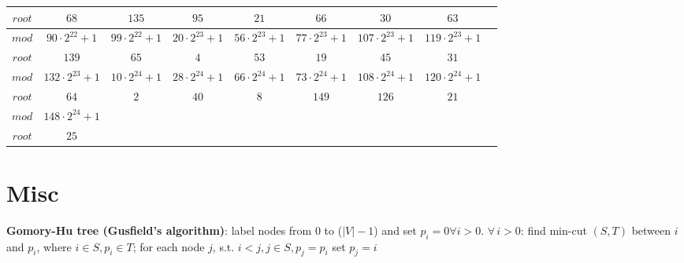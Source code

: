 \documentclass{article}
\begin{document}
\begin{tabular}{|c|c|c|c|c|c|c|c|c|}
$root$& $68$& $135$& $95$& $21$& $66$& $30$& $63$\\
\hline


$mod$& $90\cdot 2^{22}+1$& $99\cdot 2^{22}+1$& $20\cdot 2^{23}+1$& $56\cdot 2^{23}+1$& $77\cdot 2^{23}+1$& $107\cdot 2^{23}+1$& $119\cdot 2^{23}+1$\\
\hline

$root$& $139$& $65$& $4$& $53$& $19$& $45$& $31$\\
\hline


$mod$& $132\cdot 2^{23}+1$& $10\cdot 2^{24}+1$& $28\cdot 2^{24}+1$& $66\cdot 2^{24}+1$& $73\cdot 2^{24}+1$& $108\cdot 2^{24}+1$& $120\cdot 2^{24}+1$\\
\hline

$root$& $64$& $2$& $40$& $8$& $149$& $126$& $21$\\
\hline


$mod$& $148\cdot 2^{24}+1$\\
\hline

$root$& $25$\\
\hline
\end{tabular}


\newpage
\section*{Misc}

{\bf Gomory-Hu tree (Gusfield’s algorithm)}: label nodes from $0$ to ($|V| - 1$) and 
set $p_i=0 \forall i > 0$. $\forall\,i > 0$: find min-cut $(S, T)$ 
between $i$ and $p_i$, where $i \in S, p_i \in T$; 
for each node $j$, s.t. $i < j, j \in S, p_j=p_i$ set $p_j = i$



\end{document}
